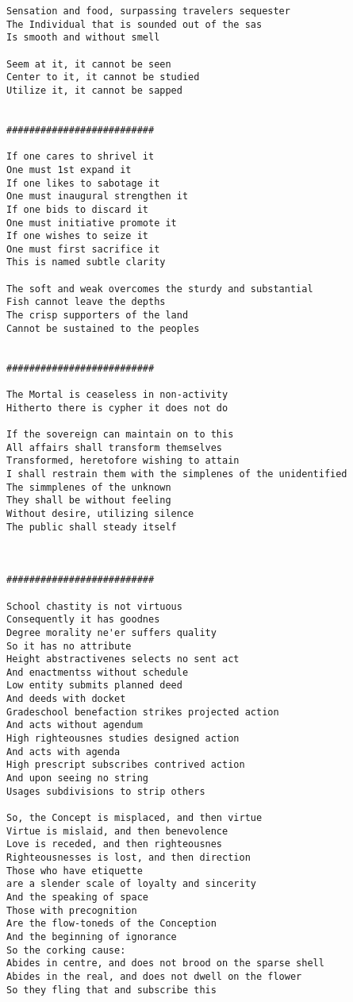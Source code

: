 \documentclass[12pt,a4paper,oneside]{book}
\begin{document}
\begin{verbatim}
Sensation and food, surpassing travelers sequester
The Individual that is sounded out of the sas
Is smooth and without smell

Seem at it, it cannot be seen
Center to it, it cannot be studied
Utilize it, it cannot be sapped


##########################

If one cares to shrivel it
One must 1st expand it
If one likes to sabotage it
One must inaugural strengthen it
If one bids to discard it
One must initiative promote it
If one wishes to seize it
One must first sacrifice it
This is named subtle clarity

The soft and weak overcomes the sturdy and substantial
Fish cannot leave the depths
The crisp supporters of the land
Cannot be sustained to the peoples


##########################

The Mortal is ceaseless in non-activity
Hitherto there is cypher it does not do

If the sovereign can maintain on to this
All affairs shall transform themselves
Transformed, heretofore wishing to attain
I shall restrain them with the simplenes of the unidentified
The simmplenes of the unknown
They shall be without feeling
Without desire, utilizing silence
The public shall steady itself



##########################

School chastity is not virtuous
Consequently it has goodnes
Degree morality ne'er suffers quality
So it has no attribute
Height abstractivenes selects no sent act
And enactmentss without schedule
Low entity submits planned deed 
And deeds with docket 
Gradeschool benefaction strikes projected action
And acts without agendum
High righteousnes studies designed action
And acts with agenda
High prescript subscribes contrived action
And upon seeing no string
Usages subdivisions to strip others

So, the Concept is misplaced, and then virtue
Virtue is mislaid, and then benevolence
Love is receded, and then righteousnes
Righteousnesses is lost, and then direction
Those who have etiquette
are a slender scale of loyalty and sincerity
And the speaking of space
Those with precognition
Are the flow-toneds of the Conception
And the beginning of ignorance
So the corking cause:
Abides in centre, and does not brood on the sparse shell
Abides in the real, and does not dwell on the flower
So they fling that and subscribe this



\end{verbatim}
\end{document}

